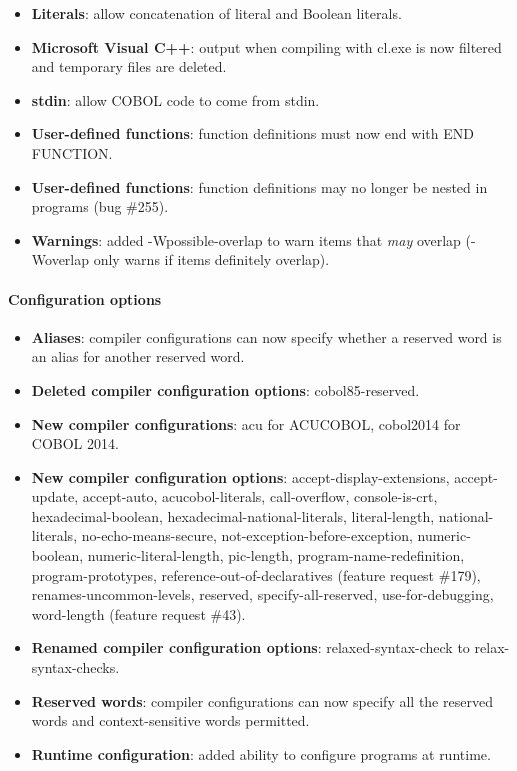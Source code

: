 \begin{itemize}
\item \textbf{Literals}: allow concatenation of literal and Boolean literals.
\item \textbf{Microsoft Visual C++}: output when compiling with cl.exe is now filtered and temporary files are deleted.
\item \textbf{stdin}: allow COBOL code to come from stdin.
\item \textbf{User-defined functions}: function definitions must now end with END FUNCTION.
\item \textbf{User-defined functions}: function definitions may no longer be nested in programs (bug \#255).
\item \textbf{Warnings}: added -Wpossible-overlap to warn items that \emph{may} overlap (-Woverlap only warns if items definitely overlap).
\end{itemize}

\paragraph{Configuration options}
\begin{itemize}
\item \textbf{Aliases}: compiler configurations can now specify whether a reserved word is an alias for another reserved word.
\item \textbf{Deleted compiler configuration options}: cobol85-reserved.
\item \textbf{New compiler configurations}: acu for ACUCOBOL, cobol2014 for COBOL 2014.
\item \textbf{New compiler configuration options}: accept-display-extensions, accept-update, accept-auto, acucobol-literals, call-overflow, console-is-crt, hexadecimal-boolean, hexadecimal-national-literals, literal-length, national-literals, no-echo-means-secure, not-exception-before-exception, numeric-boolean, numeric-literal-length, pic-length, program-name-redefinition, program-prototypes, reference-out-of-declaratives (feature request \#179), renames-uncommon-levels, reserved, specify-all-reserved, use-for-debugging, word-length (feature request \#43).
\item \textbf{Renamed compiler configuration options}: relaxed-syntax-check to relax-syntax-checks.
\item \textbf{Reserved words}: compiler configurations can now specify all the reserved words and context-sensitive words permitted.
\item \textbf{Runtime configuration}: added ability to configure programs at runtime.
\end{itemize}


